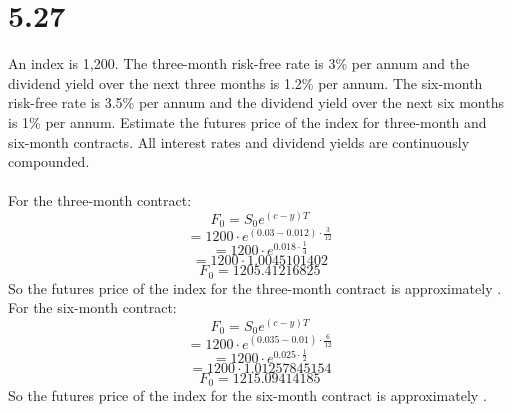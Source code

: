 \documentclass{article}
\begin{document}
{\Large 

\section*{5.27}
An index is 1,200. The three-month risk-free rate is 3\% per annum and the dividend yield over the next three months is 1.2\% per annum. The six-month risk-free rate is 3.5\% per annum and the dividend yield over the next six months is 1\% per annum. Estimate the futures price of the index for three-month and six-month contracts. All interest rates and dividend yields are continuously compounded. \\ \\ 
For the three-month contract:
\[
  F_0 = S_0 e^{(c-y)T}
\]
\[
  = 1200 \cdot e^{(0.03 - 0.012) \cdot \frac{3}{12}}
\]
\[
  = 1200 \cdot e^{0.018 \cdot \frac{1}{4}}
\]
\[
  = 1200 \cdot 1.0045101402
\]
\[
  F_0 = 1205.41216825
\]
So the futures price of the index for the three-month contract is approximately . For the six-month contract:
\[
  F_0 = S_0 e^{(c-y)T}
\]
\[
  = 1200 \cdot e^{(0.035 - 0.01) \cdot \frac{6}{12}}
\]
\[
  = 1200 \cdot e^{0.025 \cdot \frac{1}{2}}
\]
\[
  = 1200 \cdot 1.01257845154
\]
\[
  F_0 = 1215.09414185
\]
So the futures price of the index for the six-month contract is approximately .


}
\end{document}
